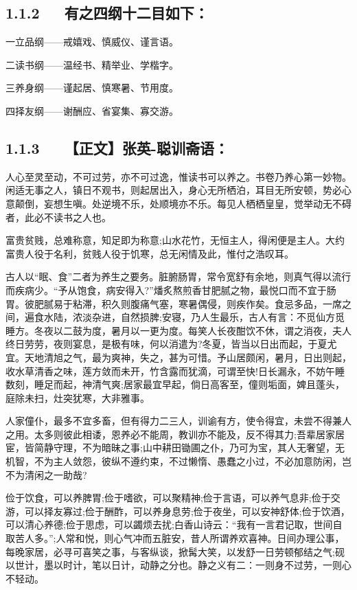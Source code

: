 \documentclass[letterpaper,10pt,english]{sphinxmanual}
\begin{document}
\subsection{1.1.2   有之四纲十二目如下：}
\label{\detokenize{p00_u5176_u5b83/_u300a_u5f20_u82f1-_u806a_u8bad_u658b_u8bed_u300b_u300a_u5f20_u5ef7_u7389-_u6f84_u6000_u56ed_u8bed_u300b_u5408_u8f91:id5}}
一立品纲——戒嬉戏、慎威仪、谨言语。

二读书纲——温经书、精举业、学楷字。

三养身纲——谨起居、慎寒暑、节用度。

四择友纲——谢酬应、省宴集、寡交游。


\subsection{1.1.3   【正文】张英-聪训斋语：}
\label{\detokenize{p00_u5176_u5b83/_u300a_u5f20_u82f1-_u806a_u8bad_u658b_u8bed_u300b_u300a_u5f20_u5ef7_u7389-_u6f84_u6000_u56ed_u8bed_u300b_u5408_u8f91:id6}}
人心至灵至动，不可过劳，亦不可过逸，惟读书可以养之。书卷乃养心第一妙物。闲适无事之人，镇日不观书，则起居出入，身心无所栖泊，耳目无所安顿，势必心意颠倒，妄想生嗔。处逆境不乐，处顺境亦不乐。每见人栖栖皇皇，觉举动无不碍者，此必不读书之人也。

富贵贫贱，总难称意，知足即为称意;山水花竹，无恒主人，得闲便是主人。大约富贵人役于名利，贫贱人役于饥寒，总无闲情及此，惟付之浩叹耳。

古人以“眠、食”二者为养生之要务。脏腑肠胃，常令宽舒有余地，则真气得以流行而疾病少。“予从饱食，病安得入?”燔炙熬煎香甘肥腻之物，最悦口而不宜于肠胃。彼肥腻易于粘滞，积久则腹痛气塞，寒暑偶侵，则疾作矣。食忌多品，一席之间，遍食水陆，浓淡杂进，自然损脾;安寝，乃人生最乐，古人有言：不觅仙方觅睡方。冬夜以二鼓为度，暑月以一更为度。每笑人长夜酣饮不休，谓之消夜，夫人终日劳劳，夜则宴息，是极有味，何以消遣为?冬夏，皆当以日出而起，于夏尤宜。天地清旭之气，最为爽神，失之，甚为可惜。予山居颇闲，暑月，日出则起，收水草清香之味，莲方敛而未开，竹含露而犹滴，可谓至快!日长漏永，不妨午睡数刻，睡足而起，神清气爽;居家最宜早起，倘日高客至，僮则垢面，婢且蓬头，庭除未扫，灶突犹寒，大非雅事。

人家僮仆，最多不宜多畜，但有得力二三人，训谕有方，使令得宜，未尝不得兼人之用。太多则彼此相诿，恩养必不能周，教训亦不能及，反不得其力;吾辈居家居宦，皆简静守理，不为暗昧之事;山中耕田锄圃之仆，乃可为宝，其人无奢望，无机智，不为主人敛怨，彼纵不遵约束，不过懒惰、愚蠢之小过，不必加意防闲，岂不为清闲之一助哉?

俭于饮食，可以养脾胃;俭于嗜欲，可以聚精神;俭于言语，可以养气息非;俭于交游，可以择友寡过;俭于酬酢，可以养身息劳;俭于夜坐，可以安神舒体;俭于饮酒，可以清心养德;俭于思虑，可以蠲烦去扰;白香山诗云：“我有一言君记取，世间自取苦人多。”;人常和悦，则心气冲而五脏安，昔人所谓养欢喜神。日间办理公事，每晚家居，必寻可喜笑之事，与客纵谈，掀髯大笑，以发舒一日劳顿郁结之气;砚以世计，墨以时计，笔以日计，动静之分也。静之义有二：一则身不过劳，一则心不轻动。
\end{document}
